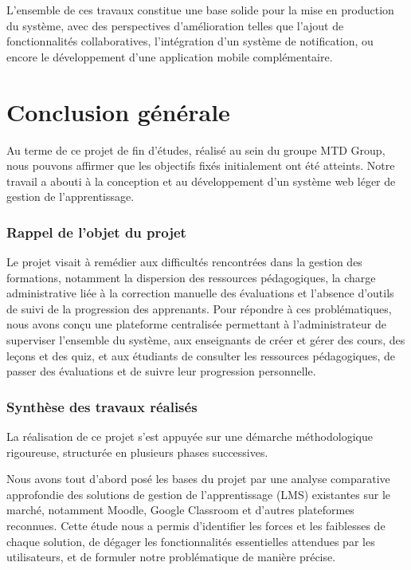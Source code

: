 \documentclass[12pt,a4paper]{report}
\begin{document}
L'ensemble de ces travaux constitue une base solide pour la mise en production du système, avec des perspectives d'amélioration telles que l'ajout de fonctionnalités collaboratives, l'intégration d'un système de notification, ou encore le développement d'une application mobile complémentaire.

\clearpage
{}
\chapter*{Conclusion générale}

Au terme de ce projet de fin d'études, réalisé au sein du groupe MTD Group, nous pouvons affirmer que les objectifs fixés initialement ont été atteints. Notre travail a abouti à la conception et au développement d'un système web léger de gestion de l'apprentissage.

\subsection*{Rappel de l'objet du projet}
Le projet visait à remédier aux difficultés rencontrées dans la gestion des formations, notamment la dispersion des ressources pédagogiques, la charge administrative liée à la correction manuelle des évaluations et l'absence d'outils de suivi de la progression des apprenants. Pour répondre à ces problématiques, nous avons conçu une plateforme centralisée permettant à l'administrateur de superviser l'ensemble du système, aux enseignants de créer et gérer des cours, des leçons et des quiz, et aux étudiants de consulter les ressources pédagogiques, de passer des évaluations et de suivre leur progression personnelle.

\subsection*{Synthèse des travaux réalisés}
La réalisation de ce projet s'est appuyée sur une démarche méthodologique rigoureuse, structurée en plusieurs phases successives.

Nous avons tout d'abord posé les bases du projet par une analyse comparative approfondie des solutions de gestion de l'apprentissage (LMS) existantes sur le marché, notamment Moodle, Google Classroom et d'autres plateformes reconnues. Cette étude nous a permis d'identifier les forces et les faiblesses de chaque solution, de dégager les fonctionnalités essentielles attendues par les utilisateurs, et de formuler notre problématique de manière précise.
\end{document}

